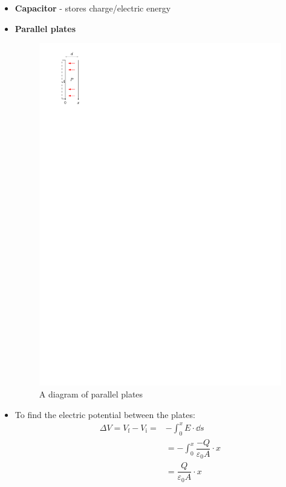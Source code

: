 \documentclass{article}
\begin{document}
    \begin{itemize}
      \item \textbf{Capacitor} - stores charge/electric energy
      \item \textbf{Parallel plates}
        \begin{figure}[H]
          \centering
          \includegraphics{figures/parallel-plates.pdf}
          \caption{A diagram of parallel plates}
        \end{figure}
      \item To find the electric potential between the plates:
        \begin{align*}
          \Delta V= V_\mathrm{f}-V_\mathrm{i}=&-\int_0^x E\cdot\dd s\\
           &=-\int_0^x \dfrac{-Q}{\varepsilon_0 A}\cdot x\\
           &=\dfrac{Q}{\varepsilon_0 A}\cdot x\\

\end{align*}
\end{itemize}
\end{document}

